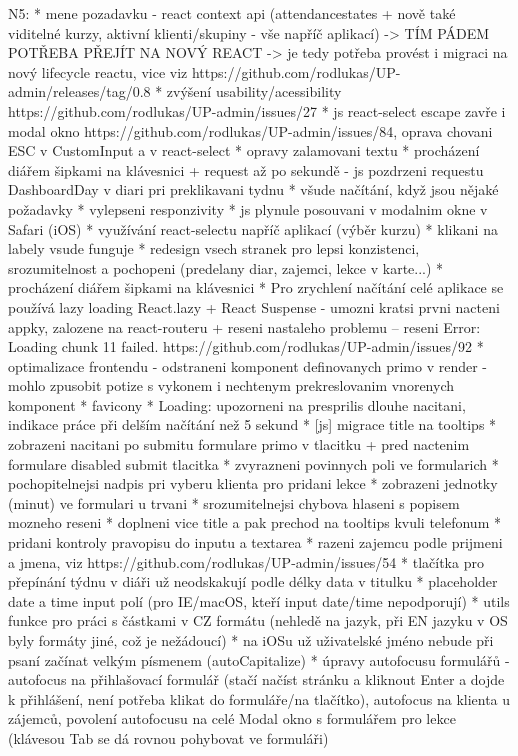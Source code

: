 N5:
* mene pozadavku - react context api (attendancestates + nově také viditelné kurzy, aktivní klienti/skupiny - vše napříč aplikací) -> TÍM PÁDEM POTŘEBA PŘEJÍT NA NOVÝ REACT -> je tedy potřeba provést i migraci na nový lifecycle reactu, vice viz https://github.com/rodlukas/UP-admin/releases/tag/0.8
* zvýšení usability/acessibility https://github.com/rodlukas/UP-admin/issues/27
* js react-select escape zavře i modal okno https://github.com/rodlukas/UP-admin/issues/84, oprava chovani ESC v CustomInput a v react-select 
* opravy zalamovani textu
* procházení diářem šipkami na klávesnici + request až po sekundě - js pozdrzeni requestu DashboardDay v diari pri preklikavani tydnu 
* všude načítání, když jsou nějaké požadavky
* vylepseni responzivity
* js plynule posouvani v modalnim okne v Safari (iOS)
* využívání react-selectu napříč aplikací (výběr kurzu)
* klikani na labely vsude funguje
* redesign vsech stranek pro lepsi konzistenci, srozumitelnost a pochopeni (predelany diar, zajemci, lekce v karte...)
* procházení diářem šipkami na klávesnici 
* Pro zrychlení načítání celé aplikace se používá lazy loading React.lazy + React Suspense - umozni kratsi prvni nacteni appky, zalozene na react-routeru + reseni nastaleho problemu -- reseni Error: Loading chunk 11 failed. https://github.com/rodlukas/UP-admin/issues/92
* optimalizace frontendu - odstraneni komponent definovanych primo v render - mohlo zpusobit potize s vykonem i nechtenym prekreslovanim vnorenych komponent
* favicony 
* Loading: upozorneni na presprilis dlouhe nacitani, indikace práce při delším načítání než 5 sekund
* [js] migrace title na tooltips
* zobrazeni nacitani po submitu formulare primo v tlacitku + pred nactenim formulare disabled submit tlacitka
* zvyrazneni povinnych poli ve formularich
* pochopitelnejsi nadpis pri vyberu klienta pro pridani lekce 
* zobrazeni jednotky (minut) ve formulari u trvani
* srozumitelnejsi chybova hlaseni s popisem mozneho reseni 
* doplneni vice title a pak prechod na tooltips kvuli telefonum
* pridani kontroly pravopisu do inputu a textarea
* razeni zajemcu podle prijmeni a jmena, viz https://github.com/rodlukas/UP-admin/issues/54
* tlačítka pro přepínání týdnu v diáři už neodskakují podle délky data v titulku
* placeholder date a time input polí (pro IE/macOS, kteří input date/time nepodporují)
* utils funkce pro práci s částkami v CZ formátu (nehledě na jazyk, při EN jazyku v OS byly formáty jiné, což je nežádoucí)
* na iOSu už uživatelské jméno nebude při psaní začínat velkým písmenem (autoCapitalize)
* úpravy autofocusu formulářů - autofocus na přihlašovací formulář (stačí načíst stránku a kliknout Enter a dojde k přihlášení, není potřeba klikat do formuláře/na tlačítko), autofocus na klienta u zájemců, povolení autofocusu na celé Modal okno s formulářem pro lekce (klávesou Tab se dá rovnou pohybovat ve formuláři)

